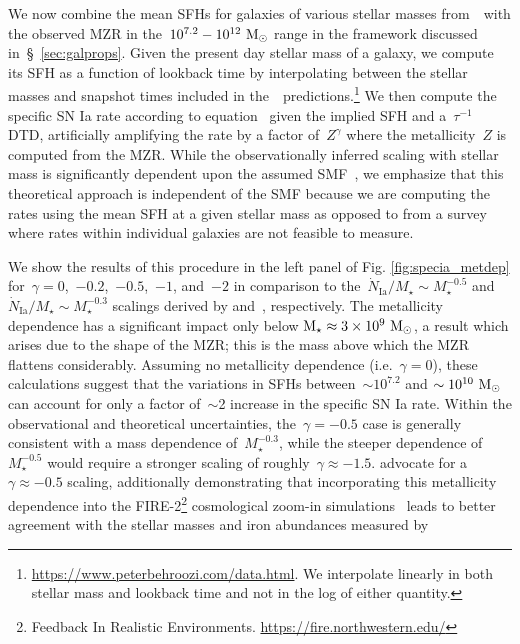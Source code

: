 \documentclass[ms.tex]{subfiles}
\begin{document}
We now combine the mean SFHs for galaxies of various stellar masses
from~\um~with the observed MZR in the~$10^{7.2} - 10^{12}~\text{M}_\odot$ range in the
framework discussed in~\S~\ref{sec:galprops}.
Given the present day stellar mass of a galaxy, we compute its SFH as a
function of lookback time by interpolating between the stellar masses and
snapshot times included in the~\um~predictions.\footnote{
	\url{https://www.peterbehroozi.com/data.html}. We interpolate linearly in
	both stellar mass and lookback time and not in the log of either
	quantity.
}
We then compute the specific SN Ia rate according to equation~
given the implied SFH and a~$\tau^{-1}$ DTD, artificially amplifying the rate
by a factor of~$Z^\gamma$ where the metallicity~$Z$ is computed from the
\citet{Zahid2014} MZR.
While the observationally inferred scaling with stellar mass is significantly
dependent upon the assumed SMF~\citep{Gandhi2022}, we emphasize that this
theoretical approach is independent of the SMF because we are computing the
rates using the mean SFH at a given stellar mass as opposed to from a survey
where rates within individual galaxies are not feasible to measure.
\par
We show the results of this procedure in the left panel of Fig.
\ref{fig:specia_metdep} for~$\gamma = 0$,~$-0.2$,~$-0.5$,~$-1$, and~$-2$ in
comparison to the~$\dot{N}_\text{Ia} / M_\star \sim M_\star^{-0.5}$ and
$\dot{N}_\text{Ia} / M_\star \sim M_\star^{-0.3}$ scalings derived by
\citet{Brown2019} and~\citet{Gandhi2022}, respectively.
The metallicity dependence has a significant impact only below
$\text{M}_\star \approx 3\times10^9~\text{M}_\odot$, a result which arises due to the shape of
the MZR; this is the mass above which the MZR flattens considerably.
Assuming no metallicity dependence (i.e.~$\gamma = 0$), these calculations
suggest that the variations in SFHs between~$\sim10^{7.2}$ and
$\sim10^{10}~\text{M}_\odot$ can account for only a factor of~$\sim$2 increase in the
specific SN Ia rate.
Within the observational and theoretical uncertainties, the~$\gamma = -0.5$
case is generally consistent with a mass dependence of~$M_\star^{-0.3}$, while
the steeper dependence of~$M_\star^{-0.5}$ would require a stronger scaling of
roughly~$\gamma \approx -1.5$.
\citet{Gandhi2022} advocate for a~$\gamma \approx -0.5$ scaling, additionally
demonstrating that incorporating this metallicity dependence into the
FIRE-2\footnote{
	Feedback In Realistic Environments.
	\url{https://fire.northwestern.edu/}
} cosmological zoom-in simulations~\citep{Hopkins2018} leads to better
agreement with the stellar masses and iron abundances measured by
\end{document}
